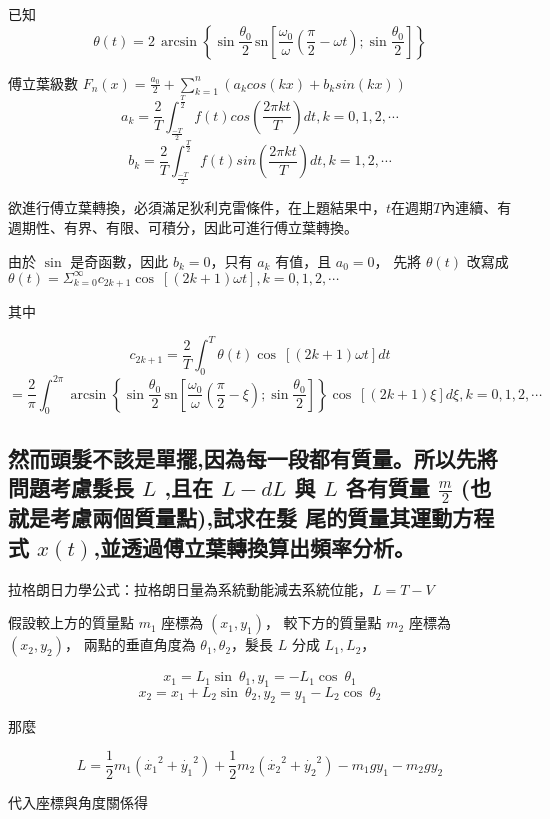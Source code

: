 \documentclass[UTF8,a4paper,12pt]{article}
\begin{document}
已知 $$\theta (t) = 2\,\arcsin \left\{ \sin\frac{\theta_0}{2} \, \mbox{sn} \left[ \frac{\omega_0}{\omega}\left(\frac{\pi}{2} - \omega t \right) 
; \sin \frac{\theta_0}{2} \right] \right\}$$

傅立葉級數 $F_n(x) = \frac{a_0}{2} + \sum_{k=1}^{n} (a_k cos(kx) + b_k sin(kx))$
$$a_k = \frac{2}{T} \int_\frac{-T}{2}^\frac{T}{2} f(t) cos(\frac{2\pi kt}{T}) dt, k=0,1,2,\cdots $$
$$b_k = \frac{2}{T} \int_\frac{-T}{2}^\frac{T}{2} f(t) sin(\frac{2\pi kt}{T}) dt, k=1,2,\cdots $$

欲進行傅立葉轉換，必須滿足狄利克雷條件，在上題結果中，$t$在週期$T$內連續、有週期性、有界、有限、可積分，因此可進行傅立葉轉換。

由於 $\sin $ 是奇函數，因此 $b_k = 0$，只有 $a_k$ 有值，且 $a_0 = 0$，
先將 $\theta(t)$ 改寫成 $\theta(t) = \Sigma^\infty_{k=0} c_{2k+1} \cos\ \left[(2k+1)\omega t\right], k=0,1,2,\cdots$

其中

$$c_{2k+1} = \frac{2}{T}\int^T_0 \theta(t) \cos\ \left[(2k+1)\omega t\right] dt$$
$$ = \frac{2}{\pi} \int^{2\pi}_0 \arcsin \left\{ \sin\frac{\theta_0}{2} \, \mbox{sn} \left[ \frac{\omega_0}{\omega}\left(\frac{\pi}{2} - \xi \right) 
; \sin \frac{\theta_0}{2} \right] \right\} \cos\ \left[(2k+1)\xi \right] d\xi,k=0,1,2,\cdots$$



\subsection{然而頭髮不該是單擺,因為每一段都有質量。所以先將問題考慮髮長
\texorpdfstring{$L$}{L} ,且在 \texorpdfstring{$L − dL$}{L-dL} 與 \texorpdfstring{$L$}{L} 
各有質量 \texorpdfstring{$\frac{m}{2}$}{m/2} (也就是考慮兩個質量點),試求在髮
尾的質量其運動方程式 \texorpdfstring{$x(t)$}{x(t)},並透過傅立葉轉換算出頻率分析。}

拉格朗日力學公式：拉格朗日量為系統動能減去系統位能，$L = T - V$

假設較上方的質量點 $m_1$ 座標為 $(x_1,y_1)$，
較下方的質量點 $m_2$ 座標為 $(x_2,y_2)$，
兩點的垂直角度為 $\theta_1, \theta_2$，髮長 $L$ 分成 $L_1,L_2$，

$$x_1=L_1\sin\ \theta_1,y_1=-L_1\cos\ \theta_1$$
$$x_2=x_1+L_2\sin\ \theta_2,y_2=y_1-L_2\cos\ \theta_2$$

那麼

$$L = \frac{1}{2}m_1(\dot{x_1}^2 + \dot{y_1}^2) + \frac{1}{2}m_2(\dot{x_2}^2 + \dot{y_2}^2)
- m_1gy_1 - m_2gy_2$$

代入座標與角度關係得
\end{document}
